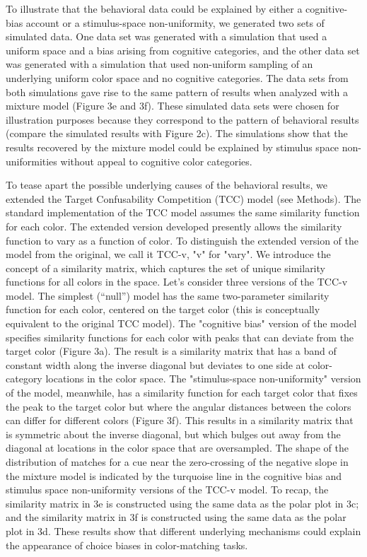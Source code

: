 To illustrate that the behavioral data could be explained by either a cognitive-bias account or a stimulus-space non-uniformity, we generated two sets of simulated data. 
One data set was generated with a simulation that used a uniform space and a bias arising from cognitive categories, and the other data set was generated with a simulation that used non-uniform sampling of an underlying uniform color space and no cognitive categories.
The data sets from both simulations gave rise to the same pattern of results when analyzed with a mixture model (Figure 3e and 3f).
These simulated data sets were chosen for illustration purposes because they correspond to the pattern of behavioral results (compare the simulated results with Figure 2c). 
The simulations show that the results recovered by the mixture model could be explained by stimulus space non-uniformities without appeal to cognitive color categories. 

To tease apart the possible underlying causes of the behavioral results, we extended the Target Confusability Competition (TCC) model \citep{schurgin_psychophysical_2020} (see Methods). 
The standard implementation of the TCC model assumes the same similarity function for each color. 
The extended version developed presently allows the similarity function to vary as a function of color. To distinguish the extended version of the model from the original, we call it TCC-v, "v" for "vary".
We introduce the concept of a similarity matrix, which captures the set of unique similarity functions for all colors in the space.
Let's consider three versions of the TCC-v model.
The simplest (“null”) model has the same two-parameter similarity function for each color, centered on the target color (this is conceptually equivalent to the original TCC model).  
The "cognitive bias" version of the model specifies similarity functions for each color with peaks that can deviate from the target color (Figure 3a). 
The result is a similarity matrix that has a band of constant width along the inverse diagonal but deviates to one side at color-category locations in the color space. 
The "stimulus-space non-uniformity" version of the model, meanwhile, has a similarity function for each target color that fixes the peak to the target color but where the angular distances between the colors can differ for different colors (Figure 3f). 
This results in a similarity matrix that is symmetric about the inverse diagonal, but which bulges out away from the diagonal at locations in the color space that are oversampled. 
The shape of the distribution of matches for a cue near the zero-crossing of the negative slope in the mixture model is indicated by the turquoise line in the cognitive bias and stimulus space non-uniformity versions of the TCC-v model. 
To recap, the similarity matrix in 3e is constructed using the same data as the polar plot in 3c; and the similarity matrix in 3f is constructed using the same data as the polar plot in 3d. 
These results show that different underlying mechanisms could explain the appearance of choice biases in color-matching tasks.

